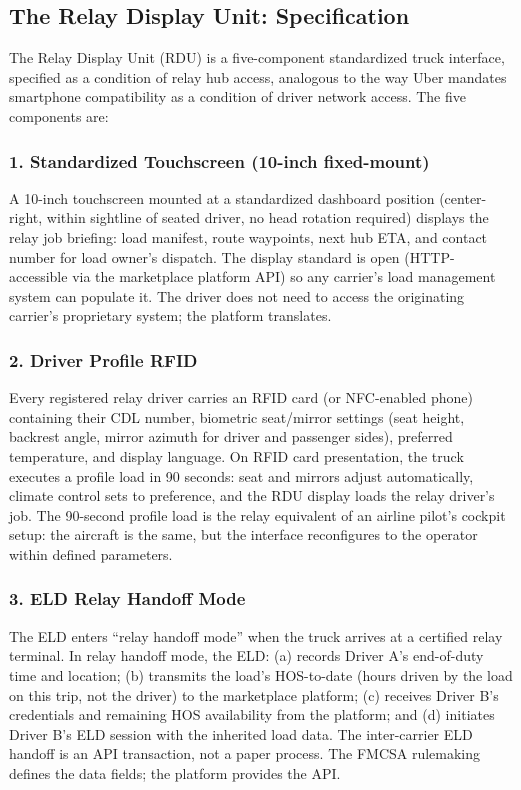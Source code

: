 \subsection{The Relay Display Unit: Specification}

The Relay Display Unit (RDU) is a five-component standardized truck interface, specified as a condition of relay hub access, analogous to the way Uber mandates smartphone compatibility as a condition of driver network access. The five components are:

\subsubsection*{1. Standardized Touchscreen (10-inch fixed-mount)}

A 10-inch touchscreen mounted at a standardized dashboard position (center-right, within sightline of seated driver, no head rotation required) displays the relay job briefing: load manifest, route waypoints, next hub ETA, and contact number for load owner's dispatch. The display standard is open (HTTP-accessible via the marketplace platform API) so any carrier's load management system can populate it. The driver does not need to access the originating carrier's proprietary system; the platform translates.

\subsubsection*{2. Driver Profile RFID}

Every registered relay driver carries an RFID card (or NFC-enabled phone) containing their CDL number, biometric seat/mirror settings (seat height, backrest angle, mirror azimuth for driver and passenger sides), preferred temperature, and display language. On RFID card presentation, the truck executes a profile load in 90 seconds: seat and mirrors adjust automatically, climate control sets to preference, and the RDU display loads the relay driver's job. The 90-second profile load is the relay equivalent of an airline pilot's cockpit setup: the aircraft is the same, but the interface reconfigures to the operator within defined parameters.

\subsubsection*{3. ELD Relay Handoff Mode}

The ELD enters ``relay handoff mode'' when the truck arrives at a certified relay terminal. In relay handoff mode, the ELD: (a) records Driver A's end-of-duty time and location; (b) transmits the load's HOS-to-date (hours driven by the load on this trip, not the driver) to the marketplace platform; (c) receives Driver B's credentials and remaining HOS availability from the platform; and (d) initiates Driver B's ELD session with the inherited load data. The inter-carrier ELD handoff is an API transaction, not a paper process. The FMCSA rulemaking defines the data fields; the platform provides the API.

